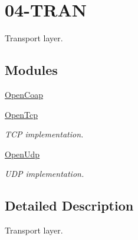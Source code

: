 \hypertarget{group___transport}{}\section{04-\/\+T\+R\+AN}
\label{group___transport}


Transport layer.  


\subsection*{Modules}
\begin{DoxyCompactItemize}
\item 
\hyperlink{group__open_coap}{Open\+Coap}
\item 
\hyperlink{group___open_tcp}{Open\+Tcp}
\begin{DoxyCompactList}\small\item\em T\+CP implementation. \end{DoxyCompactList}\item 
\hyperlink{group___open_udp}{Open\+Udp}
\begin{DoxyCompactList}\small\item\em U\+DP implementation. \end{DoxyCompactList}\end{DoxyCompactItemize}


\subsection{Detailed Description}
Transport layer. 

